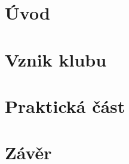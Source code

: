 \documentclass{sablona/socthesis}
\begin{document}
\maketitle

\MakeDeclaration

\ThanksPage

\AbstractsPage

\tableofcontents

\pagestyle{plain} %

\chapter{Úvod}


\chapter{Vznik klubu}



\chapter{Praktická část}



\chapter{Závěr}


\printbibliography[title={Použitá literatura}]
\listoffigures
\listoftables

\appendix

\end{document}
